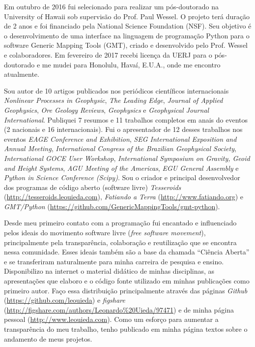 Em outubro de 2016 fui selecionado para realizar um pós-doutorado na University
of Hawaii sob supervisão do Prof. Paul Wessel.
O projeto terá duração de 2 anos e foi financiado pela National Science
Foundation (NSF).
Seu objetivo é o desenvolvimento de uma interface na linguagem de programação
Python para o software Generic Mapping Tools (GMT), criado e desenvolvido pelo
Prof. Wessel e colaboradores.
Em fevereiro de 2017 recebi licença da UERJ para o pós-doutorado e me mudei
para Honolulu, Havaí, E.U.A., onde me encontro atualmente.

Sou autor de 10 artigos publicados nos periódicos científicos internacionais
{\em Nonlinear Processes in Geophysic},
{\em The Leading Edge},
{\em Journal of Applied Geophysics},
{\em Ore Geology Reviews},
{\em Geophysics} e
{\em Geophysical Journal International}.
Publiquei 7 resumos e 11 trabalhos completos em anais do eventos (2 nacionais e
16 internacionais).
Fui o apresentador de 12 desses trabalhos nos eventos
{\em EAGE Conference and Exhibition},
{\em SEG International Exposition and Annual Meeting},
{\em International Congress of the Brazilian Geophysical Society},
{\em International GOCE User Workshop},
{\em International Symposium on Gravity, Geoid and Height Systems},
{\em AGU Meeting of the Americas},
{\em EGU General Assembly} e
{\em Python in Science Conference (Scipy)}.
Sou o criador e principal desenvolvedor dos programas de código aberto
(software livre)
{\em Tesseroids} (\url{http://tesseroids.leouieda.com}),
{\em Fatiando a Terra} (\url{http://www.fatiando.org}) e
{\em GMT/Python} (\url{https://github.com/GenericMappingTools/gmt-python}).


Desde meu primeiro contato com a programação fui encantado e influenciado pelos
ideais do movimento software livre ({\em free software movement}),
principalmente pela transparência, colaboração e reutilização que se encontra
nessa comunidade.
Esses ideais também são a base da chamada ``Ciência Aberta'' e se transferiram
naturalmente para minha carreira de pesquisa e ensino.
Disponibilizo na internet o material didático de minhas disciplinas, as
apresentações que elaboro e o código fonte utilizado em minhas publicações como
primeiro autor.
Faço essa distribuição principalmente através das páginas
{\em Github} (\url{https://github.com/leouieda}) e
{\em figshare} (\url{http://figshare.com/authors/Leonardo%20Uieda/97471})
e de minha página pessoal (\url{http://www.leouieda.com}).
Como um esforço para aumentar a transparência do meu trabalho, tenho publicado
em minha página textos sobre o andamento de meus projetos.

